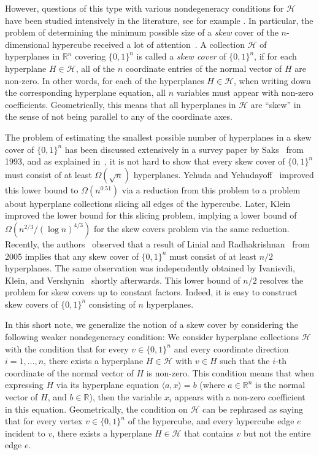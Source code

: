 \documentclass{amsart}
\theoremstyle{remark}
\numberwithin{theorem}{section}
\renewcommand{\(}{\bigl(}
\renewcommand{\)}{\bigr)\vphantom{)}}
\newcommand{\cH}{\mathcal H}
\newcommand{\R}{\mathbb R}
\newcommand{\ang}[1]{\langle#1\rangle}
\newcommand{\bin}{\{0,1\}}
\begin{document}
However, questions of this type with various nondegeneracy conditions for $\cH$ have been studied intensively in the literature, see for example \cite{Aaronson-et-al-21,Araujo-Balogh-et-al,Clifton-Huang,IKV23skew,LinialR05,saks1993,S-Wigderson-22,Saxton-2013,YY24Essential}. In particular, the problem of determining the minimum possible size of a \emph{skew} cover of the $n$-dimensional hypercube received a lot of attention~\cite{alon88balance,IKV23skew,klein2022slicing,saks1993,essential2024,yehuda2021slicing}. A collection $\cH$ of hyperplanes in $\R^n$ covering $\bin^n$ is called a \emph{skew cover} of $\bin^n$, if for each hyperplane $H\in \cH$, all of the $n$ coordinate entries of the normal vector of $H$ are non-zero. In other words, for each of the hyperplanes $H\in \cH$, when writing down the corresponding hyperplane equation, all $n$ variables must appear with non-zero coefficients. Geometrically, this means that all hyperplanes in $\cH$ are ``skew'' in the sense of not being parallel to any of the coordinate axes.

The problem of estimating the smallest possible number of hyperplanes in a skew cover of $\bin^n$ has been discussed extensively in a survey paper by Saks~\cite[Problem~3.63]{saks1993} from 1993, and as explained in~\cite[p.~241]{saks1993}, it is not hard to show that every skew cover of $\bin^n$ must consist of at least $\Omega(\sqrt{n})$ hyperplanes. Yehuda and Yehudayoff~\cite{yehuda2021slicing} improved this lower bound to $\Omega(n^{0.51})$ via a reduction from this problem to a problem about hyperplane collections slicing all edges of the hypercube. Later, Klein~\cite{klein2022slicing} improved the lower bound for this slicing problem, implying a lower bound of $\Omega(n^{2/3}/(\log n)^{4/3})$ for the skew covers problem via the same reduction. Recently, the authors~\cite{essential2024} observed that a result of Linial and Radhakrishnan~\cite{LinialR05} from 2005 implies that any skew cover  of $\bin^n$ must consist of at least $n/2$ hyperplanes. The same observation was independently obtained by Ivanisvili, Klein, and Vershynin~\cite{IKV23skew} shortly afterwards. This lower bound of $n/2$ resolves the problem for skew covers up to constant factors. Indeed, it is easy to construct skew covers  of $\bin^n$ consisting of $n$ hyperplanes.

 
In this short note, we generalize the notion of a skew cover by considering the following weaker nondegeneracy condition: We consider hyperplane collections $\cH$ with the condition that for every $v\in \bin^n$ and every coordinate direction $i=1,\dots,n$, there exists a hyperplane $H\in \cH$ with $v\in H$  such that the $i$-th coordinate of the normal vector of $H$ is non-zero. This condition means that when expressing $H$ via its hyperplane equation $\ang{a,x}=b$ (where $a\in \R^n$ is the normal vector of $H$, and $b\in \R$), then the variable $x_i$ appears with a non-zero coefficient in this equation. Geometrically, the condition on $\cH$ can be rephrased as saying that for every vertex $v\in \bin^n$ of the hypercube, and every hypercube edge $e$ incident to $v$, there exists a hyperplane $H\in \cH$ that contains $v$ but not the entire edge $e$.
\end{document}
